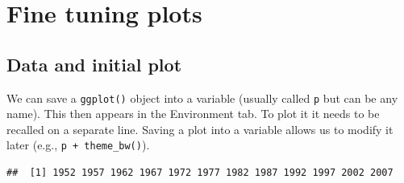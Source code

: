 \documentclass[12pt,]{krantz}
\makeatletter
\newenvironment{Shaded}{\begin{snugshade}}{\end{snugshade}}
\newcommand{\DataTypeTok}[1]{\textcolor[rgb]{0.13,0.29,0.53}{#1}}
\newcommand{\DecValTok}[1]{\textcolor[rgb]{0.00,0.00,0.81}{#1}}
\newcommand{\FloatTok}[1]{\textcolor[rgb]{0.00,0.00,0.81}{#1}}
\newcommand{\KeywordTok}[1]{\textcolor[rgb]{0.13,0.29,0.53}{\textbf{#1}}}
\newcommand{\NormalTok}[1]{#1}
\newcommand{\OperatorTok}[1]{\textcolor[rgb]{0.81,0.36,0.00}{\textbf{#1}}}
\newcommand{\OtherTok}[1]{\textcolor[rgb]{0.56,0.35,0.01}{#1}}
\newcommand{\StringTok}[1]{\textcolor[rgb]{0.31,0.60,0.02}{#1}}
\newenvironment{kframe}{%
\medskip{}
\setlength{\fboxsep}{.8em}
 \def\at@end@of@kframe{}%
 \ifinner\ifhmode%
  \def\at@end@of@kframe{\end{minipage}}%
  \begin{minipage}{\columnwidth}%
 \fi\fi%
 \def\FrameCommand##1{\hskip\@totalleftmargin \hskip-\fboxsep
 \colorbox{shadecolor}{##1}\hskip-\fboxsep
     \hskip-\linewidth \hskip-\@totalleftmargin \hskip\columnwidth}%
 \MakeFramed {\advance\hsize-\width
   \@totalleftmargin\z@ \linewidth\hsize
   \@setminipage}}%
 {\par\unskip\endMakeFramed%
 \at@end@of@kframe}
\renewenvironment{Shaded}{\begin{kframe}}{\end{kframe}}
\theoremstyle{definition}
\theoremstyle{definition}
\theoremstyle{definition}
\theoremstyle{remark}
\makeatother
\begin{document}
\hypertarget{fine-tuning-plots}{%
\chapter{Fine tuning plots}\label{fine-tuning-plots}}

\hypertarget{data-and-initial-plot}{%
\section{Data and initial plot}\label{data-and-initial-plot}}

We can save a \texttt{ggplot()} object into a variable (usually called
\texttt{p} but can be any name). This then appears in the Environment
tab. To plot it it needs to be recalled on a separate line. Saving a
plot into a variable allows us to modify it later (e.g.,
\texttt{p\ +\ theme\_bw()}).

\begin{Shaded}
\end{Shaded}

\begin{verbatim}
##  [1] 1952 1957 1962 1967 1972 1977 1982 1987 1992 1997 2002 2007
\end{verbatim}

\begin{Shaded}
\end{Shaded}
\end{document}
